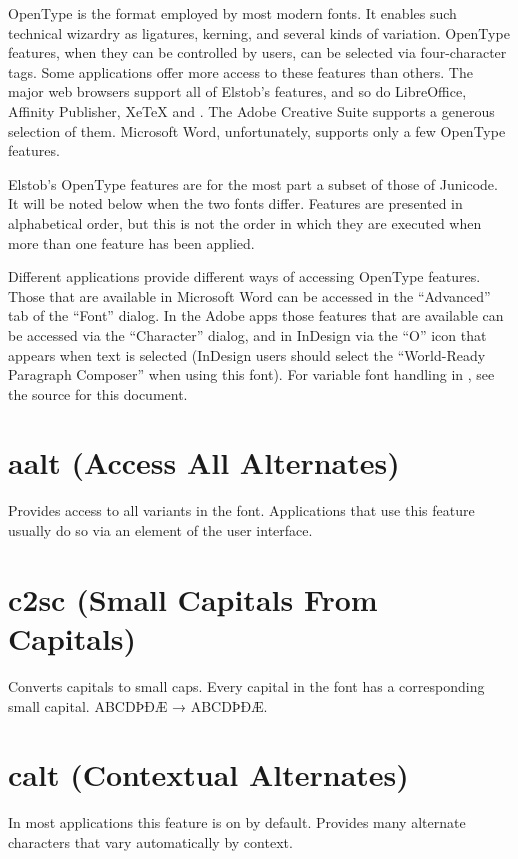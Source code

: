 \documentclass[12pt,letterpaper,openany]{book}
\begin{document}
OpenType is the format employed by most modern fonts. It enables such technical
wizardry as ligatures, kerning, and several kinds of variation. OpenType features,
when they can be controlled by users, can be selected via four-character tags.
Some applications offer more access to these features than others. The major web browsers
support all of Elstob's features, and so do LibreOffice, Affinity Publisher,
XeTeX and {\ltech}. The Adobe Creative Suite supports a generous selection of
them. Microsoft Word, unfortunately, supports only a few OpenType features.

Elstob's OpenType
features are for the most part a subset of those of Junicode. It will be noted
below when the two fonts differ. Features are presented in alphabetical order,
but this is not the order in which they are executed when more than one feature
has been applied.

Different applications provide different ways of accessing OpenType features.
Those that are available in Microsoft Word can be accessed in the “Advanced”
tab of the “Font” dialog. In the Adobe apps those features that are available
can be accessed via the “Character” dialog, and in InDesign via the “O” icon that
appears when text is selected (InDesign users should select the “World-Ready
Paragraph Composer” when using this font). For variable font handling in
{\ltech}, see the source for this document.

\section{aalt (Access All Alternates)}
Provides access to all variants in the font. Applications that use this feature
usually do so via an element of the user interface.

\section{c2sc (Small Capitals From Capitals)}
Converts capitals to small caps. Every capital in the font has a corresponding
small capital. ABCDÞÐÆ → { ABCDÞÐÆ}.

\section{calt (Contextual Alternates)}
In most applications this feature is on by default.
Provides many alternate characters that vary automatically by context.
\end{document}
